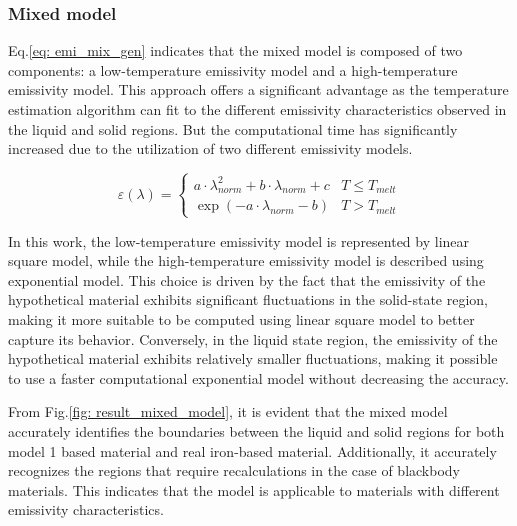 \subsubsection{Mixed model}
Eq.\ref{eq: emi_mix_gen} indicates that the mixed model is composed of two 
components: a low-temperature emissivity model and a high-temperature emissivity 
model. This approach offers a significant advantage as the temperature 
estimation algorithm can fit to the different emissivity 
characteristics observed in the liquid and solid regions. But the computational 
time has significantly increased due to the utilization of two different 
emissivity models.


\begin{equation}
    \label{eq: emi_mix}
    \varepsilon(\lambda) = \begin{cases} 
      a \cdot \lambda_{norm}^2 + b \cdot \lambda_{norm} + c &   T \leq T_{melt} \\
      \exp(-a \cdot \lambda_{norm} - b) & T > T_{melt}
    \end{cases}
  \end{equation}


In this work, the low-temperature emissivity model is represented by linear 
square model, while the high-temperature emissivity model is described using 
exponential model. This choice is driven by the fact that the emissivity of the 
hypothetical material exhibits significant fluctuations in the solid-state 
region, making it more suitable to be computed using linear 
square model to better capture its behavior. Conversely, in the liquid state 
region, the emissivity of the hypothetical material exhibits relatively smaller 
fluctuations, making it possible to use a faster computational 
exponential model without decreasing the accuracy.


From Fig.\ref{fig: result_mixed_model}, it is evident that the mixed model 
accurately identifies the boundaries between the liquid and solid regions 
for both model 1 based material and real iron-based material. 
Additionally, it accurately recognizes the regions that require 
recalculations in the case of blackbody materials. This indicates that 
the model is applicable to materials with different emissivity characteristics.



